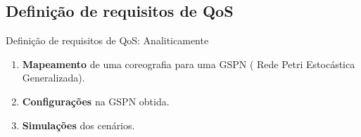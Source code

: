 \documentclass[xcolor=svgnames]{beamer}
\begin{document}
\subsection{Definição de requisitos de QoS}
  \begin{frame}{Definição de requisitos de QoS: Analiticamente}
      \begin{enumerate}
	\item <1-> \textbf{Mapeamento} de uma coreografia para uma GSPN ( Rede Petri Estocástica Generalizada).

	\item <2-> \textbf{Configurações} na GSPN obtida.
	\item <3-> \textbf{Simulações} dos cenários.
      \end{enumerate}

  \end{frame}
  
\end{document}
